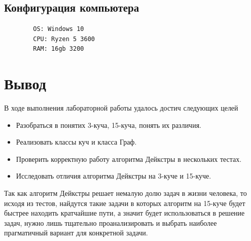 \documentclass[a4paper, 12pt]{article}
\theoremstyle{definition}
\begin{document}
	\clearpage
	\subsection{Конфигурация компьютера}
	\begin{verbatim}
		OS: Windows 10
		CPU: Ryzen 5 3600
		RAM: 16gb 3200 

	\end{verbatim}
	
	\section{Вывод}
	В ходе выполнения лабораторной работы удалось достич следующих целей
	\begin{itemize}
		\item Разобраться в понятих 3-куча, 15-куча, понять их различия.
		\item Реализовать классы куч и класса Граф.
		\item Проверить корректную работу алгоритма Дейкстры в нескольких тестах.
		\item Исследовать отличия алгоритма Дейкстры на 3-куче и 15-куче.
		
	\end{itemize}
	
	Так как алгоритм Дейкстры решает немалую долю задач в жизни человека, то исходя из тестов, найдутся такие задачи в которых алгоритм на 15-куче будет быстрее находить кратчайшие пути, а значит будет использоваться в решение задач, нужно лишь тщательно проанализировать и выбрать наиболее прагматичный вариант для конкретной задачи.
	
\end{document}
